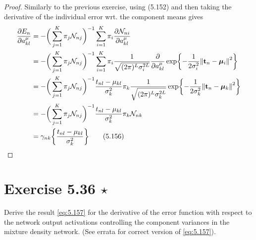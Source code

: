 \begin{proof}
    Similarly to the previous exercise, using (5.152) and
    then taking the derivative of the individual error wrt. the component
    means gives
    \begin{align*}
        \pdv{E_n}{a_{kl}^\mu}
        &= -\bigg(\sum_{j=1}^{K} \pi_j \mathcal{N}_{nj}\bigg)^{-1}
        \sum_{i=1}^{K} \pi_i \pdv{\mathcal{N}_{ni}}{a_{kl}^\mu} \\
        &= -\bigg(\sum_{j=1}^{K} \pi_j \mathcal{N}_{nj}\bigg)^{-1}
        \sum_{i=1}^{K} \pi_i \frac{1}{\sqrt{(2\pi)^L \sigma_i^{2L}}} \pdv{a_{kl}^\mu}
        \exp{-\frac{1}{2\sigma_i^2} \norm{\mathbf{t}_n - \bm{\mu}_i}^2} \\
        &= -\bigg(\sum_{j=1}^{K} \pi_j \mathcal{N}_{nj}\bigg)^{-1}
        \frac{t_{nl} - \mu_{kl}}{\sigma_k^2} \pi_k \frac{1}{\sqrt{(2\pi)^L \sigma_k^{2L}}} 
        \exp{-\frac{1}{2\sigma_k^2} \norm{\mathbf{t}_n - \bm{\mu}_k}^2} \\
        &= -\bigg(\sum_{j=1}^{K} \pi_j \mathcal{N}_{nj}\bigg)^{-1}
        \frac{t_{nl} - \mu_{kl}}{\sigma_k^2} \pi_k\mathcal{N}_{nk} \\
        &= \gamma_{nk} \bigg\{\frac{t_{nl} - \mu_{kl}}{\sigma_k^2}\bigg\} 
        \label{eq:5.156}\tag{5.156}
    \end{align*}
\end{proof}

\section*{Exercise 5.36 $\star$}
Derive the result \eqref{eq:5.157} for the derivative of the error
function with respect to the network output activations controlling
the component variances in the mixture density network.
(See errata for correct version of \eqref{eq:5.157}).

\vspace{1em}

